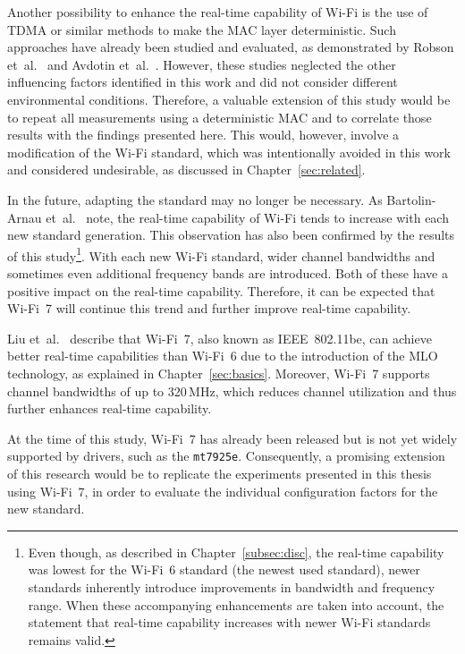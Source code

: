 Another possibility to enhance the real-time capability of Wi-Fi is the use of \ac{TDMA} or similar methods to make the \ac{MAC} layer deterministic.  
Such approaches have already been studied and evaluated, as demonstrated by Robson et~al.~\cite{8725178} and Avdotin et~al.~\cite{Avdotin_2019}.  
However, these studies neglected the other influencing factors identified in this work and did not consider different environmental conditions.  
Therefore, a valuable extension of this study would be to repeat all measurements using a deterministic \ac{MAC} and to correlate those results with the findings presented here.  
This would, however, involve a modification of the Wi-Fi standard, which was intentionally avoided in this work and considered undesirable, as discussed in Chapter~\ref{sec:related}.  

In the future, adapting the standard may no longer be necessary.  
As Bartolin-Arnau et~al.~\cite[p.~15]{telecom6020040} note, the real-time capability of Wi-Fi tends to increase with each new standard generation.  
This observation has also been confirmed by the results of this study\footnote{Even though, as described in Chapter~\ref{subsec:disc}, the real-time capability was lowest for the Wi-Fi~6 standard (the newest used standard), newer standards inherently introduce improvements in bandwidth and frequency range.
When these accompanying enhancements are taken into account, the statement that real-time capability increases with newer Wi-Fi standards remains valid.}.  
With each new Wi-Fi standard, wider channel bandwidths and sometimes even additional frequency bands are introduced.
Both of these have a positive impact on the real-time capability.  
Therefore, it can be expected that Wi-Fi~7 will continue this trend and further improve real-time capability.  

Liu et~al.~\cite[p.~3--5]{liu2025ieee80211bewifi7} describe that Wi-Fi~7, also known as IEEE~802.11be, can achieve better real-time capabilities than Wi-Fi~6 due to the introduction of the \ac{MLO} technology, as explained in Chapter~\ref{sec:basics}.  
Moreover, Wi-Fi~7 supports channel bandwidths of up to 320\,MHz, which reduces channel utilization and thus further enhances real-time capability.  

At the time of this study, Wi-Fi~7 has already been released but is not yet widely supported by drivers, such as the \texttt{mt7925e}.  
Consequently, a promising extension of this research would be to replicate the experiments presented in this thesis using Wi-Fi~7, in order to evaluate the individual configuration factors for the new standard.  

